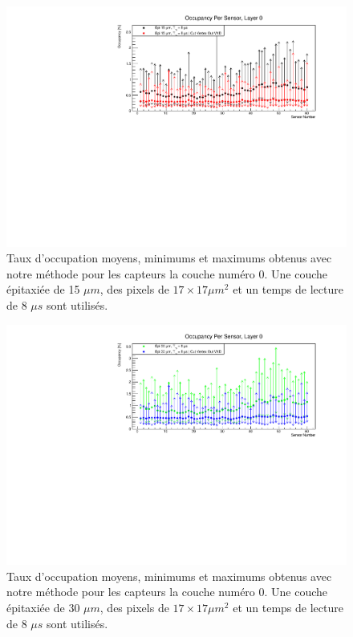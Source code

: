    \begin{figure}[!htb]
    \begin{center}
      \includegraphics[scale=0.80]{./figures/sensors_Readout_Time/resultOccupancyPerSensor/occupancyPerSensor_Layer0_epi_15um_Min_Max.pdf}
      \caption{Taux d'occupation moyens, minimums et maximums obtenus avec notre m\'ethode pour les capteurs la couche num\'ero 0. Une couche \'epitaxi\'ee de 15 $\mu m$, des pixels de $17 \times 17 \mu m^2$ et un temps de lecture de 8 $\mu s$ sont utilis\'es.}
      \label{fig:OccupancyLayer0_epi15um_Min_Max}
    \end{center}
  \end{figure}

  \begin{figure}[!htb]
    \begin{center}
      \includegraphics[scale=0.80]{./figures/sensors_Readout_Time/resultOccupancyPerSensor/occupancyPerSensor_Layer0_epi_30um_Min_Max.pdf}
      \caption{Taux d'occupation moyens, minimums et maximums obtenus avec notre m\'ethode pour les capteurs la couche num\'ero 0. Une couche \'epitaxi\'ee de 30 $\mu m$, des pixels de $17 \times 17 \mu m^2$ et un temps de lecture de 8 $\mu s$ sont utilis\'es.}
      \label{fig:OccupancyLayer0_epi30um_Min_Max}
    \end{center}
  \end{figure}
   
